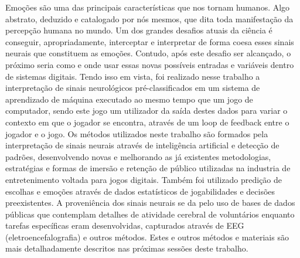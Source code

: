 \label{resumo}
\begin{resumo}


Emoções são uma das principais características que nos tornam humanos. Algo abstrato, deduzido e catalogado por nós mesmos, que dita toda manifestação da percepção humana no mundo. Um dos grandes desafios atuais da ciência é conseguir, apropriadamente, interceptar e interpretar de forma coesa esses sinais neurais que constituem as emoções. Contudo, após este desafio ser alcançado, o próximo seria como e onde usar essas novas possíveis entradas e variáveis dentro de sistemas digitais. Tendo isso em vista, foi realizado nesse trabalho a interpretação de sinais neurológicos pré-classificados em um sistema de aprendizado de máquina executado ao mesmo tempo que um jogo de computador, sendo este jogo um utilizador da saída destes dados para variar o contexto em que o jogador se encontra, através de um loop de feedback entre o jogador e o jogo. Os métodos utilizados neste trabalho são formados pela interpretação de sinais neurais através de inteligência artificial e detecção de padrões, desenvolvendo novas e melhorando as já existentes metodologias, estratégias e formas de imersão e retenção de público utilizadas na industria de entretenimento voltada para jogos digitais. Também foi utilizado predição de escolhas e emoções através de dados estatísticos de jogabilidades e decisões preexistentes. A proveniência dos sinais neurais se da pelo uso de bases de dados públicas que contemplam detalhes de atividade cerebral de voluntários enquanto tarefas específicas eram desenvolvidas, capturados através de EEG (eletroencefalografia) e outros métodos. Estes e outros métodos e materiais são mais detalhadamente descritos nas próximas sessões deste trabalho.

\palavraschave{\palavraChaveUm; \palavraChaveDois; \palavraChaveTres;  \palavraChaveQuatro; \palavraChaveCinco; \palavraChaveSeis}
\end{resumo}